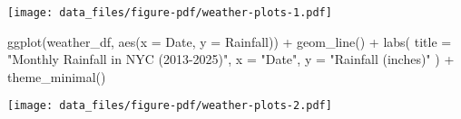\documentclass[
  letterpaper,
  DIV=11,
  numbers=noendperiod]{scrreprt}
\newenvironment{Shaded}{\begin{snugshade}}{\end{snugshade}}
\newcommand{\AttributeTok}[1]{\textcolor[rgb]{0.40,0.45,0.13}{#1}}
\newcommand{\FunctionTok}[1]{\textcolor[rgb]{0.28,0.35,0.67}{#1}}
\newcommand{\NormalTok}[1]{\textcolor[rgb]{0.00,0.23,0.31}{#1}}
\newcommand{\SpecialCharTok}[1]{\textcolor[rgb]{0.37,0.37,0.37}{#1}}
\newcommand{\StringTok}[1]{\textcolor[rgb]{0.13,0.47,0.30}{#1}}
\begin{document}
\texttt{[image: data\_files/figure-pdf/weather-plots-1.pdf]}

\begin{Shaded}
\begin{Highlighting}[]
\FunctionTok{ggplot}\NormalTok{(weather\_df, }\FunctionTok{aes}\NormalTok{(}\AttributeTok{x =}\NormalTok{ Date, }\AttributeTok{y =}\NormalTok{ Rainfall)) }\SpecialCharTok{+}
  \FunctionTok{geom\_line}\NormalTok{() }\SpecialCharTok{+}
  \FunctionTok{labs}\NormalTok{(}
    \AttributeTok{title =} \StringTok{"Monthly Rainfall in NYC (2013{-}2025)"}\NormalTok{,}
    \AttributeTok{x =} \StringTok{"Date"}\NormalTok{,}
    \AttributeTok{y =} \StringTok{"Rainfall (inches)"}
\NormalTok{  ) }\SpecialCharTok{+}
  \FunctionTok{theme\_minimal}\NormalTok{()}
\end{Highlighting}
\end{Shaded}

\texttt{[image: data\_files/figure-pdf/weather-plots-2.pdf]}
\end{document}
